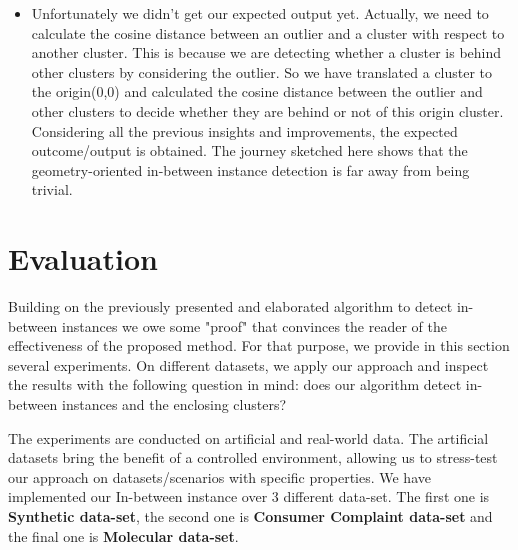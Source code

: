 \documentclass[11pt]{article}
\theoremstyle{definition}
\begin{document}
\begin{itemize}
    \item Unfortunately we didn't get our expected output yet. Actually, we need to calculate the cosine distance between an outlier and a cluster with respect to another cluster. This is because we are detecting whether a cluster is behind other clusters by considering the outlier. So we have translated a cluster to the origin(0,0) and calculated the cosine distance between the outlier and other clusters to decide whether they are behind or not of this origin cluster. Considering all the previous insights and improvements, the expected outcome/output is obtained. The journey sketched here shows that the geometry-oriented in-between instance detection is far away from being trivial.
\end{itemize}



\section{Evaluation}
Building on the previously presented and elaborated algorithm to detect in-between instances we owe some "proof" that convinces the reader of the effectiveness of the proposed method. For that purpose, we provide in this section several experiments. On different datasets, we apply our approach and inspect the results with the following question in mind: does our algorithm detect in-between instances and the enclosing clusters?

The experiments are conducted on artificial and real-world data. The artificial datasets bring the benefit of a controlled environment, allowing us to stress-test our approach on datasets/scenarios with specific properties. 
We have implemented our In-between instance over 3 different data-set. The first one is \textbf{Synthetic data-set}, the second one is \textbf{Consumer Complaint data-set} and the final one is \textbf{Molecular data-set}.
\end{document}
